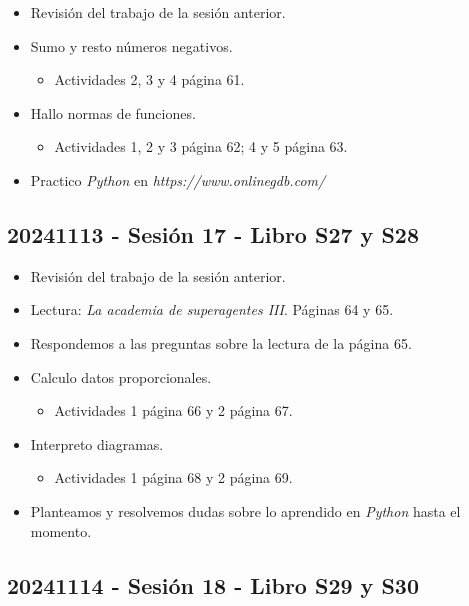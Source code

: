 \documentclass[a4paper,12pt]{article}
\begin{document}
\begin{itemize}
    \item Revisión del trabajo de la sesión anterior.
    \item Sumo y resto números negativos.
    \begin{itemize}
        \item Actividades 2, 3 y 4 página 61.
    \end{itemize}
    \item Hallo normas de funciones.
    \begin{itemize}
        \item Actividades 1, 2 y 3 página 62; 4 y 5 página 63.
    \end{itemize}
    \item Practico \textit{Python} en \textit{https://www.onlinegdb.com/}
\end{itemize}

\subsection{20241113 - Sesión 17 - Libro S27 y S28}

\begin{itemize}
    \item Revisión del trabajo de la sesión anterior.
    \item Lectura: \textit{La academia de superagentes III}. Páginas 64 y 65.
    \item Respondemos a las preguntas sobre la lectura de la página 65.
    \item Calculo datos proporcionales.
    \begin{itemize}
        \item Actividades 1 página 66 y 2 página 67.
    \end{itemize}
    \item Interpreto diagramas.
    \begin{itemize}
        \item Actividades 1 página 68 y 2 página 69.
    \end{itemize}
    \item Planteamos y resolvemos dudas sobre lo aprendido en \textit{Python} hasta el momento.
\end{itemize}

\subsection{20241114 - Sesión 18 - Libro S29 y S30}
\end{document}
